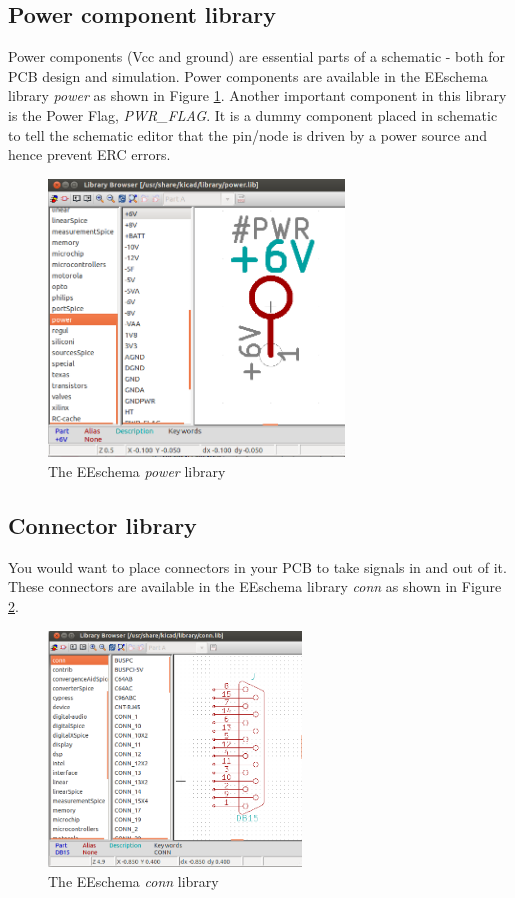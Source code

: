 \subsection{Power component library}
\label{pwr}
Power components (Vcc and ground) are essential parts of a schematic - both for PCB design and simulation. Power components are available in the EEschema library \textit{power} as shown in Figure \ref{powerlib}. Another important component in this library is the Power Flag, \textit{PWR\_FLAG}. It is a dummy component placed in schematic to tell the schematic editor that the pin/node is driven by a power source and hence prevent ERC errors. 
\begin{figure}
\centering
\includegraphics[width=0.7\textwidth]{figures/powerlib}
\caption{The EEschema \textit{power} library}
\label{powerlib}
\end{figure}
\subsection{Connector library}
You would want to place connectors in your PCB to take signals in and out of it. These connectors are available in the EEschema library \textit{conn} as shown in Figure \ref{conn}.
\begin{figure}
\centering
\includegraphics[width=0.6\textwidth]{figures/conn}
\caption{The EEschema \textit{conn} library}
\label{conn}
\end{figure}
